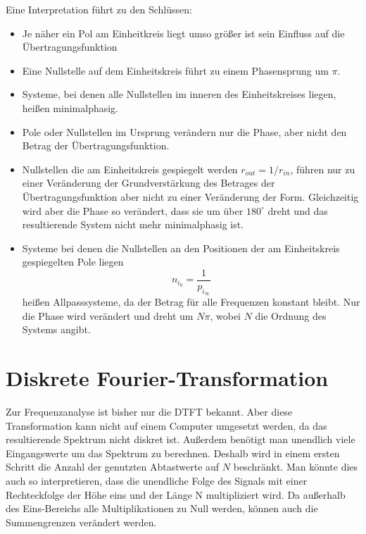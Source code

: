 Eine Interpretation führt zu den Schlüssen:
\begin{itemize}
    \item Je näher ein Pol am Einheitkreis liegt umso größer ist
    sein Einfluss auf die Übertragungsfunktion
    \item Eine Nullstelle auf dem Einheitskreis führt zu einem
    Phasensprung um $\pi$.
    \item Systeme, bei denen alle Nullstellen im inneren des 
    Einheitskreises liegen, heißen minimalphasig.
    \item Pole oder Nullstellen im Ursprung verändern nur die Phase, aber nicht den
    Betrag der Übertragungsfunktion.
    \item Nullstellen die am Einheitskreis gespiegelt werden $r_{out} = 1/r_{in}$,
    führen nur zu einer Veränderung der Grundverstärkung des Betrages der
    Übertragungsfunktion aber nicht zu einer Veränderung der Form. Gleichzeitig
    wird aber die Phase so verändert, dass sie um über $180^{\circ}$ dreht und das
    resultierende System nicht mehr minimalphasig ist.
    \item Systeme bei denen die Nullstellen an den Positionen der am Einheitskreis
    gespiegelten Pole liegen
    \begin{equation}\label{eq:AllpassGrundlagenFormel}
    n_{i_0} = \frac{1}{p_{i_{\infty}}}
    \end{equation}
    heißen Allpasssysteme, da der Betrag
    für alle Frequenzen konstant bleibt. Nur die Phase wird
    verändert und dreht um $N \pi$, wobei $N$ die Ordnung
    des Systems angibt.
\end{itemize}

\section{Diskrete Fourier-Transformation\label{sec:DFT}}
Zur Frequenzanalyse ist bisher nur die DTFT bekannt. Aber diese
Transformation kann nicht auf einem Computer umgesetzt werden, da
das resultierende Spektrum nicht diskret ist. Außerdem benötigt
man unendlich viele Eingangswerte um das Spektrum zu berechnen.
Deshalb wird in einem ersten Schritt die Anzahl der genutzten
Abtastwerte auf $N$ beschränkt. Man könnte dies auch so
interpretieren, dass die unendliche Folge des Signals mit einer
Rechteckfolge der Höhe eins und der Länge N multipliziert wird. Da
außerhalb des Eins-Bereichs alle Multiplikationen zu Null werden,
können auch die Summengrenzen verändert werden.

